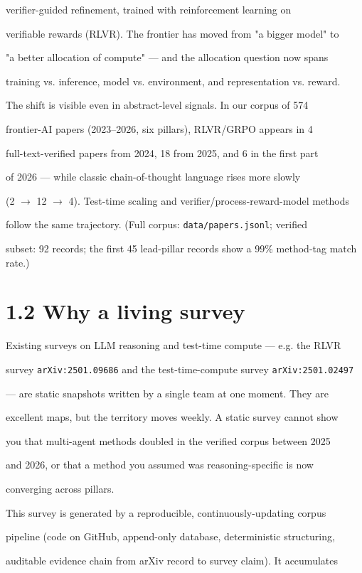 \documentclass[11pt]{article}
\begin{document}
verifier-guided refinement, trained with reinforcement learning on

verifiable rewards (RLVR). The frontier has moved from "a bigger model" to

"a better allocation of compute" --- and the allocation question now spans

training vs. inference, model vs. environment, and representation vs. reward.


The shift is visible even in abstract-level signals. In our corpus of 574

frontier-AI papers (2023--2026, six pillars), RLVR/GRPO appears in 4

full-text-verified papers from 2024, 18 from 2025, and 6 in the first part

of 2026 --- while classic chain-of-thought language rises more slowly

(2 $\rightarrow$ 12 $\rightarrow$ 4). Test-time scaling and verifier/process-reward-model methods

follow the same trajectory. (Full corpus: \texttt{data/papers.jsonl}; verified

subset: 92 records; the first 45 lead-pillar records show a 99\% method-tag match rate.)


\section{1.2 Why a living survey}

Existing surveys on LLM reasoning and test-time compute --- e.g. the RLVR

survey \texttt{arXiv:2501.09686} and the test-time-compute survey \texttt{arXiv:2501.02497}

--- are static snapshots written by a single team at one moment. They are

excellent maps, but the territory moves weekly. A static survey cannot show

you that multi-agent methods doubled in the verified corpus between 2025

and 2026, or that a method you assumed was reasoning-specific is now

converging across pillars.


This survey is generated by a reproducible, continuously-updating corpus

pipeline (code on GitHub, append-only database, deterministic structuring,

auditable evidence chain from arXiv record to survey claim). It accumulates
\end{document}
